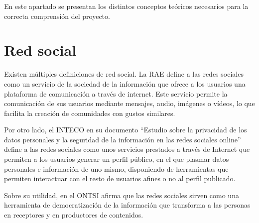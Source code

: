 
En este apartado se presentan los distintos conceptos teóricos necesarios para la correcta comprensión del proyecto.

\section{Red social}

Existen múltiples definiciones de red social. La RAE define a las redes sociales como un \guillemotleft servicio de la sociedad de la información que ofrece a los usuarios una plataforma de comunicación a través de internet\guillemotright. Este servicio permite la comunicación de sus usuarios mediante mensajes, audio, imágenes o vídeos, lo que facilita la creación de comunidades con gustos similares.

Por otro lado, el INTECO en su documento ``Estudio sobre la privacidad de los datos
personales y la seguridad de la información en las redes sociales online'' define a las redes sociales como unos \guillemotleft servicios prestados a través de Internet que permiten a los usuarios generar un perfil público, en el que plasmar datos personales e
información de uno mismo, disponiendo de herramientas que permiten interactuar
con el resto de usuarios afines o no al perfil publicado\guillemotright.

Sobre su utilidad, en \cite{ontsi_redes_sociales} el ONTSI afirma que las redes sociales sirven como una herramienta de \guillemotleft democratización de la información que transforma a las personas en receptores y en productores de contenidos\guillemotright.

